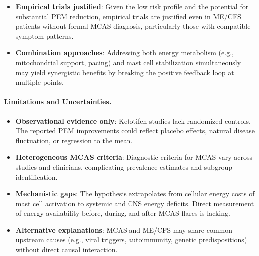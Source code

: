 \begin{speculation}
\begin{itemize}
    \item \textbf{Empirical trials justified}: Given the low risk profile and the potential for substantial PEM reduction, empirical trials are justified even in ME/CFS patients without formal MCAS diagnosis, particularly those with compatible symptom patterns.

    \item \textbf{Combination approaches}: Addressing both energy metabolism (e.g., mitochondrial support, pacing) and mast cell stabilization simultaneously may yield synergistic benefits by breaking the positive feedback loop at multiple points.
\end{itemize}

\paragraph{Limitations and Uncertainties.}

\begin{itemize}
    \item \textbf{Observational evidence only}: Ketotifen studies lack randomized controls. The reported PEM improvements could reflect placebo effects, natural disease fluctuation, or regression to the mean.

    \item \textbf{Heterogeneous MCAS criteria}: Diagnostic criteria for MCAS vary across studies and clinicians, complicating prevalence estimates and subgroup identification.

    \item \textbf{Mechanistic gaps}: The hypothesis extrapolates from cellular energy costs of mast cell activation to systemic and CNS energy deficits. Direct measurement of energy availability before, during, and after MCAS flares is lacking.

    \item \textbf{Alternative explanations}: MCAS and ME/CFS may share common upstream causes (e.g., viral triggers, autoimmunity, genetic predispositions) without direct causal interaction.
\end{itemize}
\end{speculation}

